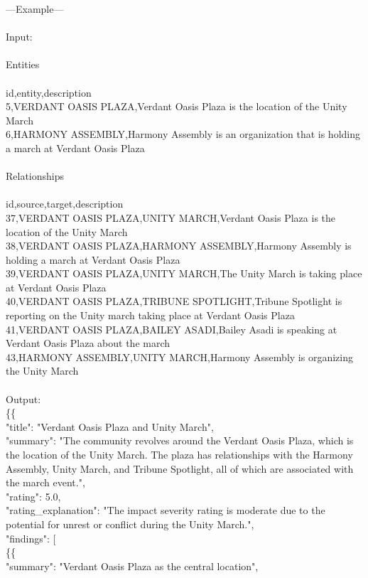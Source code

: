 {---Example---\\
\\
Input:\\
\\
Entities\\
\\
id,entity,description\\
5,VERDANT OASIS PLAZA,Verdant Oasis Plaza is the location of the Unity March\\
6,HARMONY ASSEMBLY,Harmony Assembly is an organization that is holding a march at Verdant Oasis Plaza\\
\\
Relationships\\
\\
id,source,target,description\\
37,VERDANT OASIS PLAZA,UNITY MARCH,Verdant Oasis Plaza is the location of the Unity March\\
38,VERDANT OASIS PLAZA,HARMONY ASSEMBLY,Harmony Assembly is holding a march at Verdant Oasis Plaza\\
39,VERDANT OASIS PLAZA,UNITY MARCH,The Unity March is taking place at Verdant Oasis Plaza\\
40,VERDANT OASIS PLAZA,TRIBUNE SPOTLIGHT,Tribune Spotlight is reporting on the Unity march taking place at Verdant Oasis Plaza\\
41,VERDANT OASIS PLAZA,BAILEY ASADI,Bailey Asadi is speaking at Verdant Oasis Plaza about the march\\
43,HARMONY ASSEMBLY,UNITY MARCH,Harmony Assembly is organizing the Unity March\\
\\
Output:\\
\{\{\\
    "title": "Verdant Oasis Plaza and Unity March",\\
    "summary": "The community revolves around the Verdant Oasis Plaza, which is the location of the Unity March. The plaza has relationships with the Harmony Assembly, Unity March, and Tribune Spotlight, all of which are associated with the march event.",\\
    "rating": 5.0,\\
    "rating\_explanation": "The impact severity rating is moderate due to the potential for unrest or conflict during the Unity March.",\\
    "findings": [\\
        \{\{\\
            "summary": "Verdant Oasis Plaza as the central location",\\
}
